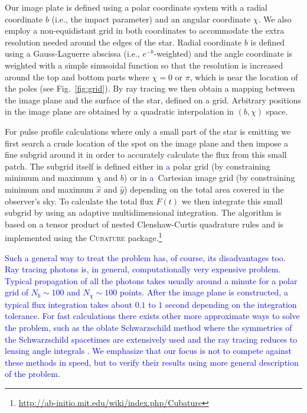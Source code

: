 \documentclass{aa}
\newcommand{\refe}[1]{\textcolor{blue}{{#1}}}
\newcommand{\sch}{Schwarzschild }
\begin{document}
Our image plate is defined using a polar coordinate system with a radial
coordinate $b$ (i.e., the impact parameter) and an angular coordinate $\chi$.
We also employ a non-equidistant grid in both coordinates to accommodate
the extra resolution needed around the edges of the star.  Radial
coordinate $b$ is defined using a Gauss-Laguerre abscissa (i.e.,
$e^{-b}$-weighted) and the angle coordinate is weighted with a simple
sinusoidal function so that the resolution is increased around the top
and bottom parts where $\chi = 0$ or $\pi$, which is near the location of the poles
(see Fig.~\ref{fig:grid}).  By ray tracing we then obtain
a mapping between the image plane and the surface of the star, defined
on a grid.
Arbitrary positions in the image plane are obtained by a quadratic interpolation in $(b, \chi)$ space.

For pulse profile calculations where only a small part of the star is
emitting we first search a crude location of the spot on the image plane
and then impose a fine subgrid around it in order to accurately
calculate the flux from this small patch.  The subgrid itself is defined
either in \refe{a} polar grid (by constraining minimum and maximum $\chi$ and
$b$) or in \refe{a} Cartesian image grid (by constraining minimum and maximum
$\hat{x}$ and $\hat{y}$) depending on the total area covered in the observer's sky.  To
calculate the total flux $F(t)$ we then integrate this small subgrid by
using an adaptive multidimensional integration.  
The algorithm is based on a tensor product of nested Clenshaw-Curtis quadrature rules and is implemented using the \textsc{Cubature} package.\footnote{
\url{http://ab-initio.mit.edu/wiki/index.php/Cubature}}

\refe{
Such a general way to treat the problem has, of course, its disadvantages too.
Ray tracing photons is, in general, computationally very expensive problem.
Typical propagation of all the photons takes usually around a minute for a polar grid of $N_b \sim 100$ and $N_{\chi} \sim 100$ points.
After the image plane is constructed, a typical flux integration takes about $0.1$ to $1$ second depending on the integration tolerance.
For fast calculations there exists other more approximate ways to solve the problem, such as the oblate \sch method where the symmetries of the \sch spacetimes are extensively used and the ray tracing reduces to lensing angle integrals \citep[see e.g.][]{PB06, MLCB07}.
We emphasize that our focus is not to compete against these methods in speed, but to verify their results using more general description of the problem.
}
\end{document}
